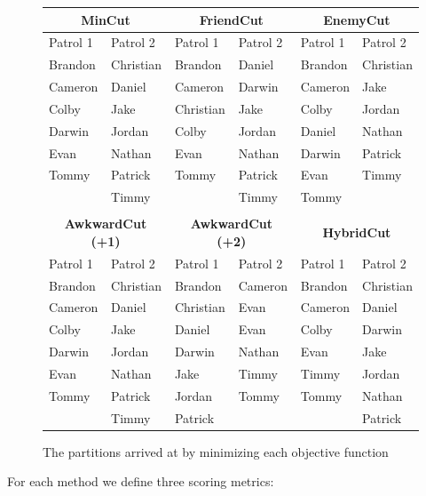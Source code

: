 \documentclass{amsart}
\theoremstyle{definition}
\theoremstyle{remark}
\numberwithin{equation}{section}
\begin{document}
\clearpage

\begin{figure}[h]
\centering
\begin{tabular}{ |l|l|l|l|l|l| }
\hline
\multicolumn{2}{|c|}{\textbf{MinCut}} & \multicolumn{2}{|c|}{\textbf{FriendCut}} & \multicolumn{2}{|c|}{\textbf{EnemyCut}}\\
\hline
Patrol 1 & Patrol 2 & Patrol 1 & Patrol 2 & Patrol 1 & Patrol 2\\
\hline
Brandon & Christian & Brandon & Daniel & Brandon & Christian\\
Cameron & Daniel & Cameron & Darwin & Cameron & Jake\\
Colby & Jake & Christian & Jake & Colby & Jordan\\
Darwin & Jordan & Colby & Jordan  & Daniel & Nathan\\
Evan & Nathan & Evan & Nathan & Darwin & Patrick\\
Tommy & Patrick & Tommy & Patrick & Evan & Timmy\\
& Timmy & & Timmy & Tommy & \\
\hline
\multicolumn{6}{|c|}{\hphantom{1}} \\
\hline
\multicolumn{2}{|c|}{\textbf{AwkwardCut (+1)}} & \multicolumn{2}{|c|}{\textbf{AwkwardCut (+2)}} & \multicolumn{2}{|c|}{\textbf{HybridCut}} \\
\hline
Patrol 1 & Patrol 2 & Patrol 1 & Patrol 2 & Patrol 1 & Patrol 2\\
\hline
Brandon & Christian & Brandon & Cameron & Brandon & Christian\\
Cameron & Daniel & Christian & Evan & Cameron & Daniel\\
Colby & Jake & Daniel & Evan & Colby & Darwin\\
Darwin & Jordan & Darwin & Nathan & Evan & Jake\\
Evan & Nathan & Jake & Timmy & Timmy & Jordan\\
Tommy & Patrick & Jordan & Tommy & Tommy & Nathan\\
\hphantom{1} & Timmy & Patrick & \hphantom{1} & \hphantom{1} & Patrick\\
\hline
\end{tabular}
\caption{The partitions arrived at by minimizing each objective function}
\end{figure}

For each method we define three scoring metrics:
\end{document}
